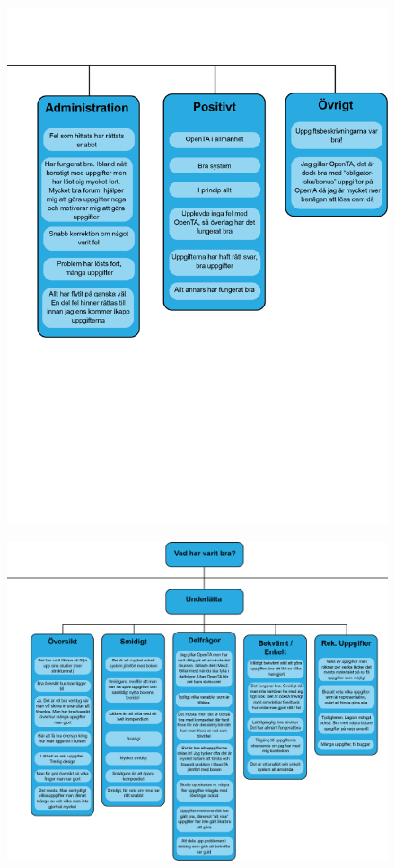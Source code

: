 
\begin{figure}[hbtp]
    \centering
    \includegraphics[scale=0.56,angle=90]{appendix/appendix_blue/nr7_part3.png}
    \caption*{}
    \label{fig:nr7_part3}
\end{figure}

\begin{figure}[hbtp]
    \centering
    \includegraphics[scale=0.56,angle=90]{appendix/appendix_blue/nr7_part2.png}
    \caption*{}
    \label{fig:nr7_part2}
\end{figure}

